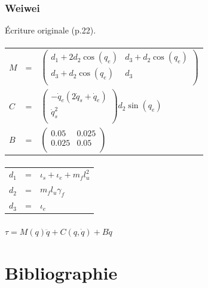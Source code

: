 \documentclass[pdftex,a4paper,11pt]{article}
\numberwithin{equation}{subsection}
\begin{document}

\subsubsection{Weiwei}
Écriture originale \cite{li2006} (p.22).

\paragraph{}
\begin{tabular}{lcl}
    $M$ & = &
    $
    \begin{pmatrix}
        d_1 + 2 d_2 \cos(q_e)  & d_3 + d_2 \cos(q_e) \\
        d_3 + d_2 \cos(q_e) & d_3 \\
    \end{pmatrix}
    $ \\

    $C$ & = &
    $
    \begin{pmatrix}
        -\dot{q}_e (2 \dot{q}_s + \dot{q}_e) \\
        \dot{q}_s^2 \\
    \end{pmatrix}
    d_2 \sin(q_e)
    $\\

    $B$ & = &
    $
    \begin{pmatrix}
        0.05  & 0.025 \\
        0.025 & 0.05 \\
    \end{pmatrix}
    $
\end{tabular}

\paragraph{}
\begin{tabular}{lcl}
    $d_1$ & = & $\iota_s + \iota_e + m_f l_u^2$ \\
    $d_2$ & = & $m_f l_u \gamma_f$ \\
    $d_3$ & = & $\iota_e$ \\
\end{tabular}

\paragraph{}
$\tau = M(q)\ddot{q} + C(q, \dot{q}) + B\dot{q}$
 

\section{Bibliographie}




\end{document}
